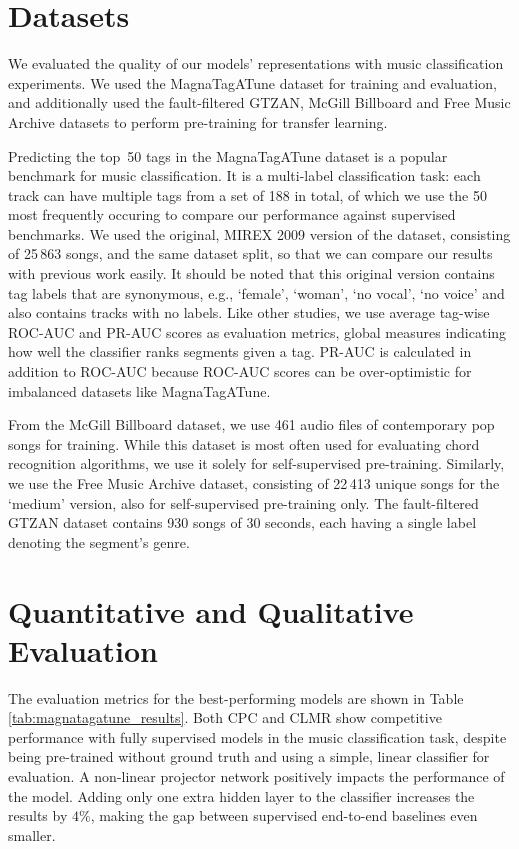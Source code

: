 \documentclass{report}
\begin{document}
\section{Datasets}
We evaluated the quality of our models' representations with music classification experiments. We used the MagnaTagATune\cite{law2009evaluation} dataset for training and evaluation, and additionally used the fault-filtered GTZAN\cite{tzanetakis2002musical,sturm2013gtzan}, McGill Billboard\cite{burgoyne_billboard} and Free Music Archive\cite{fma_dataset} datasets to perform pre-training for transfer learning. 

Predicting the top~50 tags in the Magna\-Tag\-A\-Tune dataset is a popular benchmark for music classification. It is a multi-label classification task: each track can have multiple tags from a set of 188 in total, of which we use the 50 most frequently occuring to compare our performance against supervised benchmarks. 
We used the original, MIREX 2009 version of the dataset, consisting of 25\,863 songs, and the same dataset split, so that we can compare our results with previous work\cite{pons_end--end_2017, lee2018samplecnn, dieleman_feature_learning} easily. It should be noted that this original version contains tag labels that are synonymous, e.g., `female', `woman', `no vocal', `no voice' and also contains tracks with no labels.
Like other studies, we use average tag-wise ROC-AUC and PR-AUC scores as evaluation metrics, global measures indicating how well the classifier ranks segments given a tag. PR-AUC is calculated in addition to ROC-AUC because ROC-AUC scores can be over-optimistic for imbalanced datasets like MagnaTagATune\cite{pons_end--end_2017}. 

From the McGill Billboard dataset, we use 461 audio files of contemporary pop songs for training. While this dataset is most often used for evaluating chord recognition algorithms, we use it solely for self-supervised pre-training.
Similarly, we use the Free Music Archive dataset, consisting of 22\,413 unique songs for the `medium' version, also for self-supervised pre-training only. The fault-filtered GTZAN dataset contains 930 songs of 30 seconds, each having a single label denoting the segment's genre.

\section{Quantitative and Qualitative Evaluation}
The evaluation metrics for the best-performing models are shown in Table \ref{tab:magnatagatune_results}. Both CPC and CLMR show competitive performance with fully supervised models in the music classification task, despite being pre-trained without ground truth and using a simple, linear classifier for evaluation. A non-linear projector network positively impacts the performance of the model. Adding only one extra hidden layer to the classifier increases the results by $4\%$, making the gap between supervised end-to-end baselines even smaller.
\end{document}
